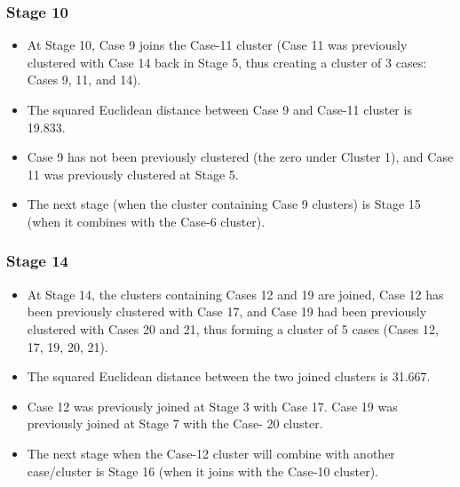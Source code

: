\documentclass[a4paper,12pt]{article}
\begin{document}
\subsubsection{Stage 10}
\begin{itemize}
	\item At Stage 10, Case 9 joins the Case-11 cluster (Case 11 was previously clustered with Case 14 back in Stage
	5, thus creating a cluster of 3 cases: Cases 9, 11, and 14). 
	\item The squared Euclidean distance between Case 9
	and Case-11 cluster is 19.833. 
	\item Case 9 has not been previously clustered (the zero under Cluster 1), and
	Case 11 was previously clustered at Stage 5. 
	\item The next stage (when the cluster containing Case 9 clusters) is
	Stage 15 (when it combines with the Case-6 cluster).
\end{itemize}


\subsubsection{Stage 14}
\begin{itemize}
	\item At Stage 14, the clusters containing Cases 12 and 19 are joined, Case 12 has been previously clustered with
	Case 17, and Case 19 had been previously clustered with Cases 20 and 21, thus forming a cluster of 5 cases
	(Cases 12, 17, 19, 20, 21). 
	\item The squared Euclidean distance between the two joined clusters is 31.667. 
	\item Case
	12 was previously joined at Stage 3 with Case 17. Case 19 was previously joined at Stage 7 with the Case-
	20 cluster. 
	\item The next stage when the Case-12 cluster will combine with another case/cluster is Stage 16
	(when it joins with the Case-10 cluster).
\end{itemize}
\end{document}
